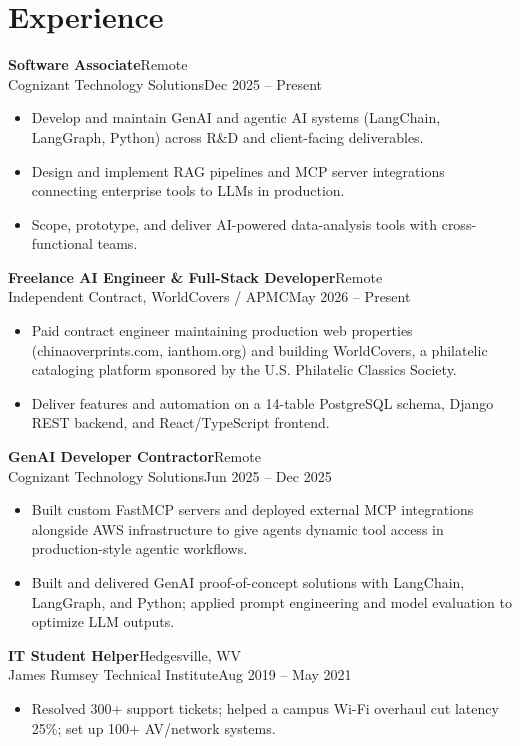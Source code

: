 \documentclass[10pt]{article}
\newcommand{\dentry}[4]{\noindent\textbf{#1}\hfill{#2}\\{#3}\hfill{#4}\par}
\begin{document}
\section*{Experience}
\dentry{Software Associate}{Remote}{Cognizant Technology Solutions}{Dec 2025 – Present}
\begin{itemize}
  \item Develop and maintain GenAI and agentic AI systems (LangChain, LangGraph, Python) across R\&D and client-facing deliverables.
  \item Design and implement RAG pipelines and MCP server integrations connecting enterprise tools to LLMs in production.
  \item Scope, prototype, and deliver AI-powered data-analysis tools with cross-functional teams.
\end{itemize}
\dentry{Freelance AI Engineer \& Full-Stack Developer}{Remote}{Independent Contract, WorldCovers / APMC}{May 2026 – Present}
\begin{itemize}
  \item Paid contract engineer maintaining production web properties (chinaoverprints.com, ianthom.org) and building WorldCovers, a philatelic cataloging platform sponsored by the U.S. Philatelic Classics Society.
  \item Deliver features and automation on a 14-table PostgreSQL schema, Django REST backend, and React/TypeScript frontend.
\end{itemize}
\dentry{GenAI Developer Contractor}{Remote}{Cognizant Technology Solutions}{Jun 2025 – Dec 2025}
\begin{itemize}
  \item Built custom FastMCP servers and deployed external MCP integrations alongside AWS infrastructure to give agents dynamic tool access in production-style agentic workflows.
  \item Built and delivered GenAI proof-of-concept solutions with LangChain, LangGraph, and Python; applied prompt engineering and model evaluation to optimize LLM outputs.
\end{itemize}
\dentry{IT Student Helper}{Hedgesville, WV}{James Rumsey Technical Institute}{Aug 2019 – May 2021}
\begin{itemize}
  \item Resolved 300+ support tickets; helped a campus Wi-Fi overhaul cut latency 25\%; set up 100+ AV/network systems.
\end{itemize}
\end{document}
